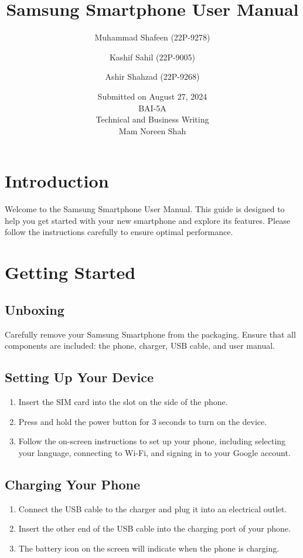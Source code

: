 \documentclass{article}
\title{Samsung Smartphone User Manual}
\author{Muhammad Shafeen (22P-9278) \and Kashif Sahil (22P-9005) \and Ashir Shahzad (22P-9268)}
\date{Submitted on August 27, 2024\\BAI-5A\\Technical and Business Writing\\Mam Noreen Shah}
\begin{document}
\maketitle

\section*{Introduction}
Welcome to the Samsung Smartphone User Manual. This guide is designed to help you get started with your new smartphone and explore its features. Please follow the instructions carefully to ensure optimal performance.

\tableofcontents

\section{Getting Started}
\subsection{Unboxing}
Carefully remove your Samsung Smartphone from the packaging. Ensure that all components are included: the phone, charger, USB cable, and user manual.

\subsection{Setting Up Your Device}
\begin{enumerate}
    \item Insert the SIM card into the slot on the side of the phone.
    \item Press and hold the power button for 3 seconds to turn on the device.
    \item Follow the on-screen instructions to set up your phone, including selecting your language, connecting to Wi-Fi, and signing in to your Google account.
\end{enumerate}

\subsection{Charging Your Phone}
\begin{enumerate}
    \item Connect the USB cable to the charger and plug it into an electrical outlet.
    \item Insert the other end of the USB cable into the charging port of your phone.
    \item The battery icon on the screen will indicate when the phone is charging.
\end{enumerate}
\end{document}
